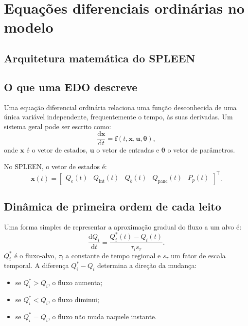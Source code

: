 \documentclass[11pt,a4paper,oneside]{book}
\newcommand{\diff}[2]{\frac{\mathrm{d}#1}{\mathrm{d}#2}}
\begin{document}
\chapter{Equações diferenciais ordinárias no modelo}

\section*{Arquitetura matemática do SPLEEN}


\section{O que uma EDO descreve}
Uma equação diferencial ordinária relaciona uma função desconhecida de uma única variável independente, frequentemente o tempo, às suas derivadas. Um sistema geral pode ser escrito como:
\begin{equation}
  \diff{\bm{x}}{t}=\bm{f}(t,\bm{x},\bm{u},\bm{\theta}),
  \label{eq:general-ode}
\end{equation}
onde $\bm{x}$ é o vetor de estados, $\bm{u}$ o vetor de entradas e $\bm{\theta}$ o vetor de parâmetros.

No SPLEEN, o vetor de estados é:
\begin{equation}
 \bm{x}(t)=
 \begin{bmatrix}
 Q_e(t)&Q_{\mathrm{int}}(t)&Q_b(t)&Q_{\mathrm{panc}}(t)&P_p(t)
 \end{bmatrix}^{\mathsf T}.
\end{equation}

\section{Dinâmica de primeira ordem de cada leito}
Uma forma simples de representar a aproximação gradual do fluxo a um alvo é:
\begin{equation}
  \diff{Q_i}{t}=\frac{Q_i^*(t)-Q_i(t)}{\tau_i s_\tau}.
  \label{eq:flow-ode}
\end{equation}
$Q_i^*$ é o fluxo-alvo, $\tau_i$ a constante de tempo regional e $s_\tau$ um fator de escala temporal. A diferença $Q_i^*-Q_i$ determina a direção da mudança:
\begin{itemize}
  \item se $Q_i^*>Q_i$, o fluxo aumenta;
  \item se $Q_i^*<Q_i$, o fluxo diminui;
  \item se $Q_i^*=Q_i$, o fluxo não muda naquele instante.
\end{itemize}
\end{document}
